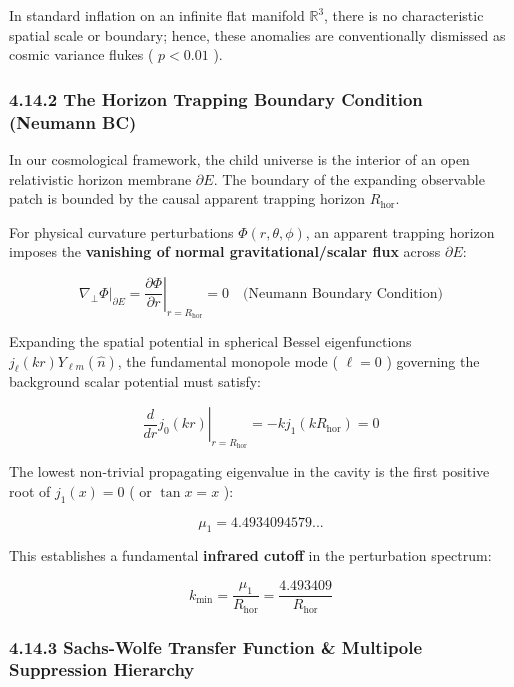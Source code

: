 \documentclass[11pt,a4paper]{article}
\theoremstyle{definition}\newtheorem{definition}{Definition}
\theoremstyle{remark}\newtheorem{remark}{Remark}
\begin{document}
In standard inflation on an infinite flat manifold $\mathbb{R}^3$, there is no characteristic spatial scale or boundary; hence, these anomalies are conventionally dismissed as cosmic variance flukes ( $p < 0.01$ ).
\subsubsection{4.14.2 The Horizon Trapping Boundary Condition (Neumann BC)}

In our cosmological framework, the child universe is the interior of an open relativistic horizon membrane $\partial E$. The boundary of the expanding observable patch is bounded by the causal apparent trapping horizon $R_{\text{hor}}$.

For physical curvature perturbations $\Phi(r, \theta, \phi)$, an apparent trapping horizon imposes the \textbf{vanishing of normal gravitational/scalar flux} across $\partial E$:


\begin{equation}
\left. \nabla_\perp \Phi \right|_{\partial E} = \left. \frac{\partial \Phi}{\partial r} \right|_{r = R_{\text{hor}}} = 0 \quad \text{(Neumann Boundary Condition)}
\end{equation}


Expanding the spatial potential in spherical Bessel eigenfunctions $j_\ell(kr) Y_{\ell m}(\hat{n})$, the fundamental monopole mode ( $\ell = 0$ ) governing the background scalar potential must satisfy:


\begin{equation}
\left. \frac{d}{dr} j_0(kr) \right|_{r = R_{\text{hor}}} = -k j_1(k R_{\text{hor}}) = 0
\end{equation}


The lowest non-trivial propagating eigenvalue in the cavity is the first positive root of $j_1(x) = 0$ ( or $\tan x = x$ ):


\begin{equation}
\mu_1 = 4.4934094579...
\end{equation}


This establishes a fundamental \textbf{infrared cutoff} in the perturbation spectrum:


\begin{equation}
k_{\text{min}} = \frac{\mu_1}{R_{\text{hor}}} = \frac{4.493409}{R_{\text{hor}}}
\end{equation}

\subsubsection{4.14.3 Sachs-Wolfe Transfer Function \& Multipole Suppression Hierarchy}
\end{document}
